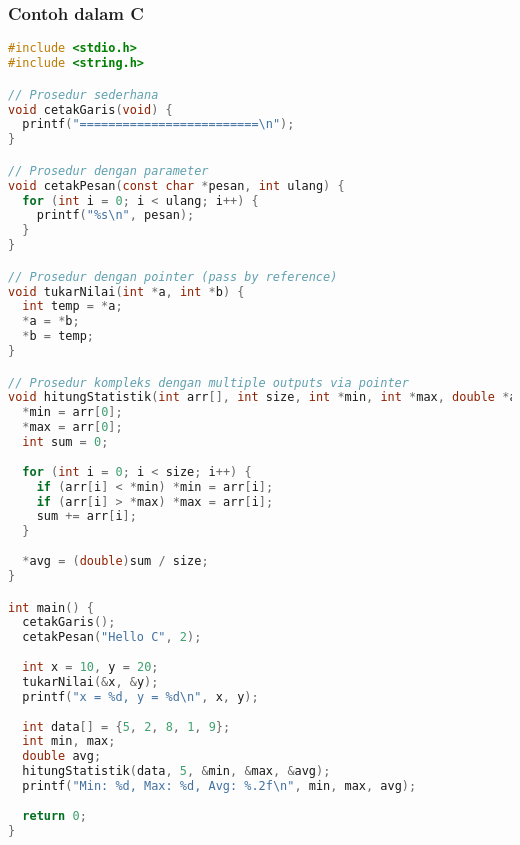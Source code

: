 \documentclass[../main.tex]{subfiles}
\begin{document}
\subsubsection{Contoh dalam C}
\begin{lstlisting}[language=C, caption={Definisi prosedur (C)}]
#include <stdio.h>
#include <string.h>

// Prosedur sederhana
void cetakGaris(void) {
  printf("=========================\n");
}

// Prosedur dengan parameter
void cetakPesan(const char *pesan, int ulang) {
  for (int i = 0; i < ulang; i++) {
    printf("%s\n", pesan);
  }
}

// Prosedur dengan pointer (pass by reference)
void tukarNilai(int *a, int *b) {
  int temp = *a;
  *a = *b;
  *b = temp;
}

// Prosedur kompleks dengan multiple outputs via pointer
void hitungStatistik(int arr[], int size, int *min, int *max, double *avg) {
  *min = arr[0];
  *max = arr[0];
  int sum = 0;
  
  for (int i = 0; i < size; i++) {
    if (arr[i] < *min) *min = arr[i];
    if (arr[i] > *max) *max = arr[i];
    sum += arr[i];
  }
  
  *avg = (double)sum / size;
}

int main() {
  cetakGaris();
  cetakPesan("Hello C", 2);
  
  int x = 10, y = 20;
  tukarNilai(&x, &y);
  printf("x = %d, y = %d\n", x, y);
  
  int data[] = {5, 2, 8, 1, 9};
  int min, max;
  double avg;
  hitungStatistik(data, 5, &min, &max, &avg);
  printf("Min: %d, Max: %d, Avg: %.2f\n", min, max, avg);
  
  return 0;
}
\end{lstlisting}
\end{document}
